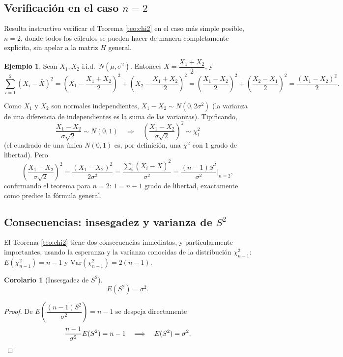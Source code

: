 \documentclass[11pt,a4paper]{article}
\theoremstyle{plain}
\newtheorem{corolario}[teorema]{Corolario}
\theoremstyle{definition}
\newtheorem{ejemplo}[teorema]{Ejemplo}
\theoremstyle{remark}
\begin{document}
\subsection{Verificación en el caso $n=2$}

Resulta instructivo verificar el Teorema \ref{teo:chi2} en el caso más simple posible, $n=2$, donde todos los cálculos se pueden hacer de manera completamente explícita, sin apelar a la matriz $H$ general.

\begin{ejemplo}
Sean $X_1,X_2$ i.i.d.\ $N(\mu,\sigma^2)$. Entonces $\bar X = \dfrac{X_1+X_2}{2}$, y
$$\sum_{i=1}^2 (X_i-\bar X)^2 = \left(X_1-\frac{X_1+X_2}{2}\right)^2+\left(X_2-\frac{X_1+X_2}{2}\right)^2 = \left(\frac{X_1-X_2}{2}\right)^2+\left(\frac{X_2-X_1}{2}\right)^2 = \frac{(X_1-X_2)^2}{2}.$$

Como $X_1$ y $X_2$ son normales independientes, $X_1-X_2 \sim N(0,2\sigma^2)$ (la varianza de una diferencia de independientes es la suma de las varianzas). Tipificando,
$$\frac{X_1-X_2}{\sigma\sqrt2} \sim N(0,1) \quad\Longrightarrow\quad \left(\frac{X_1-X_2}{\sigma\sqrt2}\right)^2 \sim \chi^2_1$$
(el cuadrado de una única $N(0,1)$ es, por definición, una $\chi^2$ con $1$ grado de libertad). Pero
$$\left(\frac{X_1-X_2}{\sigma\sqrt2}\right)^2 = \frac{(X_1-X_2)^2}{2\sigma^2} = \frac{\sum_i(X_i-\bar X)^2}{\sigma^2} = \frac{(n-1)S^2}{\sigma^2}\bigg|_{n=2},$$
confirmando el teorema para $n=2$: $1=n-1$ grado de libertad, exactamente como predice la fórmula general.
\end{ejemplo}

\subsection{Consecuencias: insesgadez y varianza de $S^2$}

El Teorema \ref{teo:chi2} tiene dos consecuencias inmediatas, y particularmente importantes, usando la esperanza y la varianza conocidas de la distribución $\chi^2_{n-1}$: $E(\chi^2_{n-1})=n-1$ y $\mathrm{Var}(\chi^2_{n-1})=2(n-1)$.

\begin{corolario}[Insesgadez de $S^2$]
$$E(S^2) = \sigma^2.$$
\end{corolario}

\begin{proof}
De $E\left(\dfrac{(n-1)S^2}{\sigma^2}\right) = n-1$ se despeja directamente
$$\frac{n-1}{\sigma^2}E(S^2) = n-1 \quad\Longrightarrow\quad E(S^2)=\sigma^2. \qedhere$$
\end{proof}
\end{document}
